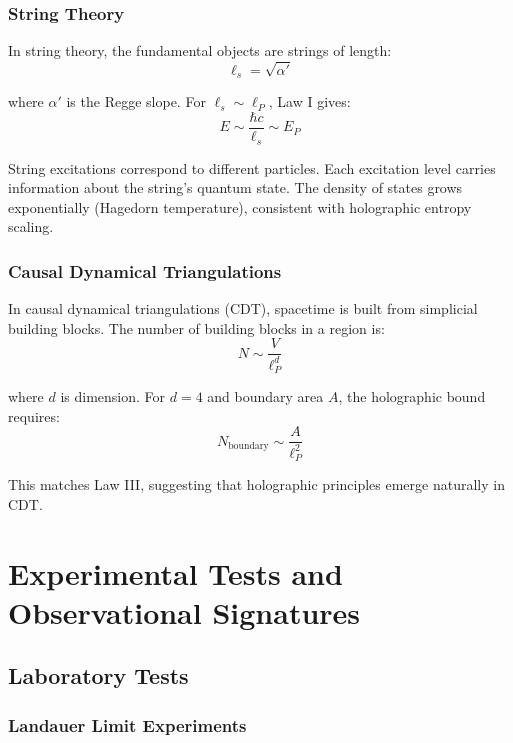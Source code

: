 \documentclass[11pt,a4paper]{article}
\theoremstyle{plain}
\theoremstyle{definition}
\theoremstyle{remark}
\begin{document}
\subsubsection{String Theory}

In string theory, the fundamental objects are strings of length:
\begin{equation}
\ell_s = \sqrt{\alpha'}
\end{equation}

where $\alpha'$ is the Regge slope. For $\ell_s \sim \ell_P$, Law I gives:
\begin{equation}
E \sim \frac{\hbar c}{\ell_s} \sim E_P
\end{equation}

String excitations correspond to different particles. Each excitation level carries information about the string's quantum state. The density of states grows exponentially (Hagedorn temperature), consistent with holographic entropy scaling.

\subsubsection{Causal Dynamical Triangulations}

In causal dynamical triangulations (CDT), spacetime is built from simplicial building blocks. The number of building blocks in a region is:
\begin{equation}
N \sim \frac{V}{\ell_P^d}
\end{equation}

where $d$ is dimension. For $d=4$ and boundary area $A$, the holographic bound requires:
\begin{equation}
N_{\text{boundary}} \sim \frac{A}{\ell_P^2}
\end{equation}

This matches Law III, suggesting that holographic principles emerge naturally in CDT.

\section{Experimental Tests and Observational Signatures}
\label{sec:experimental}

\subsection{Laboratory Tests}

\subsubsection{Landauer Limit Experiments}
\end{document}
